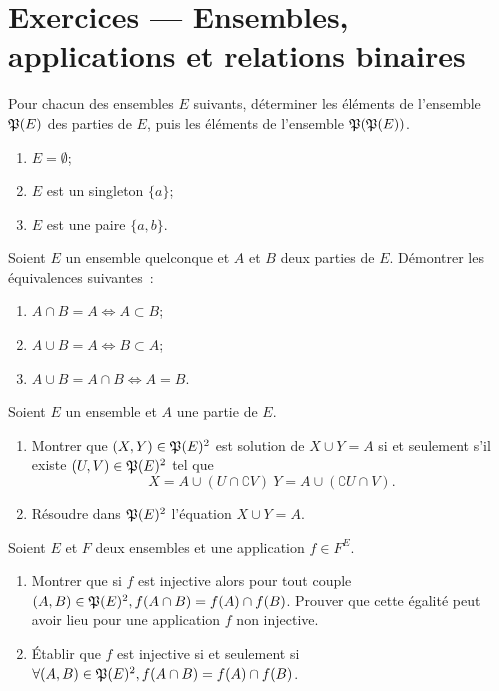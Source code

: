 \section{Exercices --- Ensembles, applications et relations binaires}

\begin{exercice}
  Pour chacun des ensembles \(E\) suivants, déterminer les éléments de 
  l'ensemble \(\Part(E)\) des parties de \(E\), puis les éléments de 
  l'ensemble \(\mathfrak{P}(\mathfrak{P}(E))\).
  \begin{enumerate}
    \item \(E = \emptyset\);
    \item \(E\) est un singleton \(\{a\}\);
    \item \(E\) est une paire \(\{a, b\}\).
  \end{enumerate}
\end{exercice}

\begin{exercice}
  Soient \(E\) un ensemble quelconque et \(A\) et \(B\) deux parties de \(E\). 
  Démontrer les équivalences suivantes~:
  \begin{enumerate}
    \item \(A \cap B = A \iff A \subset B \);
    \item \(A \cup B = A \iff B \subset A \);
    \item \(A \cup B = A \cap B \iff A = B \).
  \end{enumerate}
\end{exercice}

\begin{exercice}[Résolution dans \(\Part(E)\) des équations \(X \cup Y = A\) et 
  \(X \cap Y = A\)]
  Soient \(E\) un ensemble et \(A\) une partie de \(E\).
  \begin{enumerate}
    \item Montrer que \((X,Y)\in\mathfrak{P}(E)^2\) est solution de \(X \cup Y = A\) 
      si et seulement s'il existe \((U, V) \in \mathfrak{P}(E)^2\) tel que 
      \[X = A\cup(U\cap \complement V) \ Y = A\cup(\complement U \cap V).\]
    \item Résoudre dans \(\mathfrak{P}(E)^2\) l'équation \(X \cup Y = A\).
  \end{enumerate}
\end{exercice}

\begin{exercice}
  Soient \(E\) et \(F\) deux ensembles et une application \(f \in F^E\).
  \begin{enumerate}
    \item Montrer que si \(f\) est injective alors pour tout couple \((A,B) 
      \in \mathfrak{P}(E)^2, f(A\cap B) = f(A) \cap f(B)\). Prouver que cette 
      égalité peut avoir lieu pour une application \(f\) non injective.
    \item Établir que \(f\) est injective si et seulement si \(\forall (A,B) 
      \in \mathfrak{P}(E)^2, f(A\cap B) = f(A) \cap f(B)\).
  \end{enumerate}
\end{exercice}

